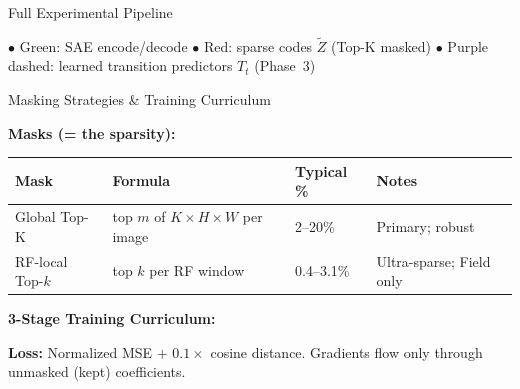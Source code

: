 \documentclass[final]{beamer}
\newlength{\colwidth}
\begin{document}
\begin{frame}[t]
\begin{columns}[t]
\begin{column}{\colwidth}
\begin{block}{Full Experimental Pipeline}
\begin{center}
\begin{tikzpicture}[node distance=0.4cm and 0.25cm, scale=0.82, transform shape]
\end{tikzpicture}
\end{center}

{\small
\textcolor{AccentGreen}{$\bullet$ Green:} SAE encode/decode \quad
\textcolor{AccentRed}{$\bullet$ Red:} sparse codes $\tilde{Z}$ (Top-K masked) \quad
\textcolor{AccentPurple}{$\bullet$ Purple dashed:} learned transition predictors $T_t$ (Phase~3)}
\end{block}

\vspace{0.5em}

\begin{block}{Masking Strategies \& Training Curriculum}
\small

\textbf{Masks (= the sparsity):}
\begin{center}
\begin{tabular}{@{}llll@{}}
\toprule
\textbf{Mask} & \textbf{Formula} & \textbf{Typical \%} & \textbf{Notes} \\
\midrule
Global Top-K & top $m$ of $K\!\times\!H\!\times\!W$ per image & 2--20\% & Primary; robust \\
RF-local Top-$k$ & top $k$ per RF window & 0.4--3.1\% & Ultra-sparse; Field only \\
\bottomrule
\end{tabular}
\end{center}

\vspace{0.4em}
\textbf{3-Stage Training Curriculum:}
\begin{center}
\end{center}
\textbf{Loss:} Normalized MSE $+$ $0.1\times$ cosine distance.
Gradients flow only through unmasked (kept) coefficients.
\end{block}


\end{column}
\end{columns}
\end{frame}
\end{document}
